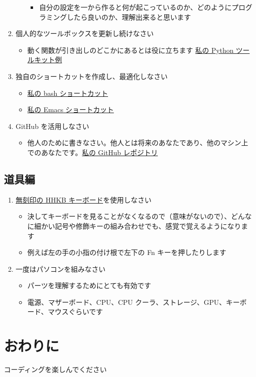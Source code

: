 \documentclass[a4paper,11pt,uplatex]{jsarticle}
\begin{document}
\begin{enumerate}
\begin{itemize}
        \begin{itemize}
            \item 自分の設定を一から作ると何が起こっているのか、どのようにプログラミングしたら良いのか、理解出来ると思います
        \end{itemize}
    \end{itemize}
    \item 個人的なツールボックスを更新し続けなさい
    \begin{itemize}
        \item 動く関数が引き出しのどこかにあるとは役に立ちます \href{https://github.com/ywatanabe1989/mngs}{私の Python ツールキット例}
    \end{itemize}
    \item 独自のショートカットを作成し、最適化しなさい
    \begin{itemize}
        \item \href{https://github.com/ywatanabe1989/.dotfiles-public/tree/main/.bash.d/all}{私の bash ショートカット}
        \item \href{https://github.com/ywatanabe1989/.dotfiles-public/.emacs.d/}{私の Emacs ショートカット}
    \end{itemize}
    \item GitHub を活用しなさい
    \begin{itemize}
        \item 他人のために書きなさい。他人とは将来のあなたであり、他のマシン上でのあなたです。\href{https://github.com/ywatanabe1989/}{私の GitHub レポジトリ}
    \end{itemize}
\end{enumerate}

\subsection{道具編}
\begin{enumerate}
    \item \href{https://hhkeyboard.us/hhkb/pro-hybrid-type-s/sku/cg01000-297301}{無刻印の HHKB キーボード}を使用しなさい
    \begin{itemize}
        \item 決してキーボードを見ることがなくなるので（意味がないので）、どんなに細かい記号や修飾キーの組み合わせでも、感覚で覚えるようになります
        \item 例えば左の手の小指の付け根で左下の Fn キーを押したりします
    \end{itemize}
    \item 一度はパソコンを組みなさい
    \begin{itemize}
        \item パーツを理解するためにとても有効です
        \item 電源、マザーボード、CPU、CPU クーラ、ストレージ、GPU、キーボード、マウスぐらいです
    \end{itemize}
\end{enumerate}

\section{おわりに}
コーディングを楽しんでください
\end{document}
